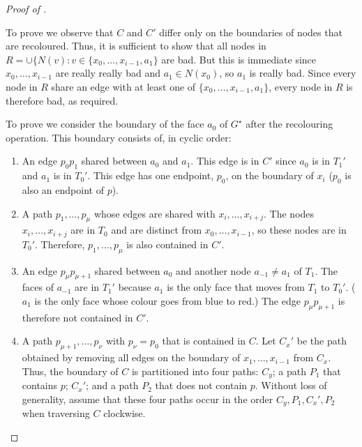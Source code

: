 \documentclass{patmorin}
\newcommand{\dual}[1]{{#1}^\star}
\begin{document}
\begin{proof}[Proof of ]
\begin{enumerate}
   To prove  we observe that $C$ and $C'$ differ only on
   the boundaries of nodes that are recoloured.  Thus, it is sufficient
   to show that all nodes in $R=\cup\{N(v): v\in\{x_0,\ldots,x_{i-1},a_1\}$
   are bad.  But this is immediate since $x_0,\ldots,x_{i-1}$ are really
   really bad and $a_1\in N(x_0)$, so $a_1$ is really bad.  Since every node in $R$ share an edge with at least one of $\{x_0,\ldots,x_{i-1},a_1\}$, every
   node in $R$ is therefore bad, as required.

   To prove  we consider the boundary of the face
   $a_0$ of $\dual{G}$ after the recolouring operation.  This boundary
   consists of, in cyclic order:
   \begin{enumerate}
     \item  An edge $p_0p_1$ shared between $a_0$ and $a_1$.  This edge is in
       $C'$ since $a_0$ is in $T_1'$ and $a_1$ is in $T_0'$. This edge has one endpoint, $p_0$, on the boundary of $x_i$ ($p_0$ is also an endpoint of $p$).

     \item A path $p_1,\ldots,p_\mu$ whose edges are shared with $x_i,\ldots,x_{i+j}$.  The nodes $x_i,\ldots,x_{i+j}$ are in $T_0$ and are distinct from $x_0,\ldots,x_{i-1}$, so these nodes are in $T_0'$.
     Therefore, $p_1,\ldots,p_\mu$ is also contained in $C'$.

     \item An edge $p_\mu p_{\mu+1}$ shared between $a_0$ and another node $a_{-1}\neq
     a_1$ of $T_1$. The faces of $a_{-1}$ are in $T_1'$ because $a_1$
     is the only face that moves from $T_1$ to $T_0'$. ($a_1$ is the
     only face whose colour goes from blue to red.)  The edge $p_\mu p_{\mu+1}$ is therefore not contained in $C'$.

     \item A path $p_{\mu+1},\ldots,p_\nu$ with $p_\nu=p_0$ that is contained in $C$. Let $C_x'$ be the path obtained by removing all edges on the boundary of $x_1,\ldots,x_{i-1}$ from $C_x$.  Thus, the boundary of $C$ is partitioned into four paths: $C_y$; a path $P_1$ that contains $p$; $C_x'$; and a path $P_2$ that does not contain $p$.  Without loss of generality, assume that these four paths occur in the order $C_y,P_1,C_x',P_2$ when traversing $C$ clockwise.


\end{enumerate}
\end{enumerate}
\end{proof}
\end{document}
